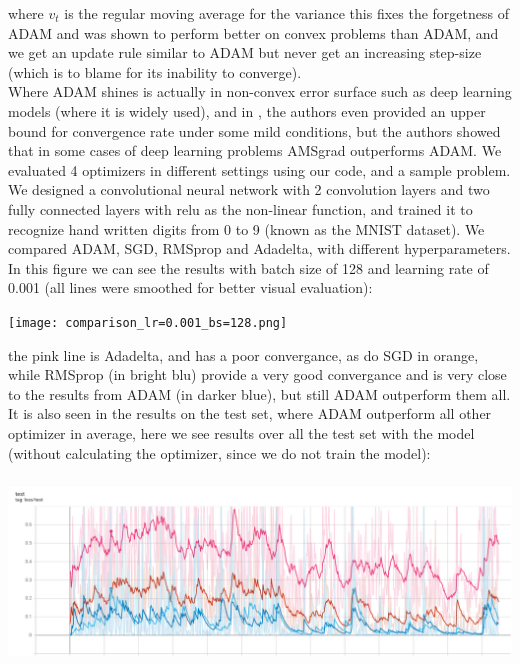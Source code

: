 \documentclass[10pt,a4paper]{article}
\begin{document}
where $v_t$ is the regular moving average for the variance
this fixes the forgetness of ADAM and was shown to perform better on convex problems than ADAM, and we get an update rule similar to ADAM but never get an increasing step-size (which is to blame for its inability to converge).\\
Where ADAM shines is actually in non-convex error surface such as deep learning models (where it is widely used), and in \cite{chen2018convergence}, the authors even provided an upper bound for convergence rate under some mild conditions, but the authors showed that in some cases of deep learning problems AMSgrad outperforms ADAM.
We evaluated 4 optimizers in different settings using our code, and a sample problem. We designed a convolutional neural network with 2 convolution layers and two fully connected layers with relu as the non-linear function, and trained it to recognize hand written digits from 0 to 9 (known as the MNIST dataset). We compared ADAM, SGD, RMSprop and Adadelta, with different hyperparameters.\\
In this figure we can see the results with batch size of 128 and learning rate of 0.001 (all lines were smoothed for better visual evaluation):\\
\begin{center}
    \texttt{[image: comparison\_lr=0.001\_bs=128.png]}
\end{center}
the pink line is Adadelta, and has a poor convergance, as do SGD in orange, while RMSprop (in bright blu) provide a very good convergance and is very close to the results from ADAM (in darker blue), but still ADAM outperform them all.\\
It is also seen in the results on the test set, where ADAM outperform all other optimizer in average, here we see results over all the test set with the model (without calculating the optimizer, since we do not train the model):
\begin{center}
    \includegraphics[width=15cm, height=5cm]{test_lr=0.001_batch size=128.png}
\end{center}
\end{document}
